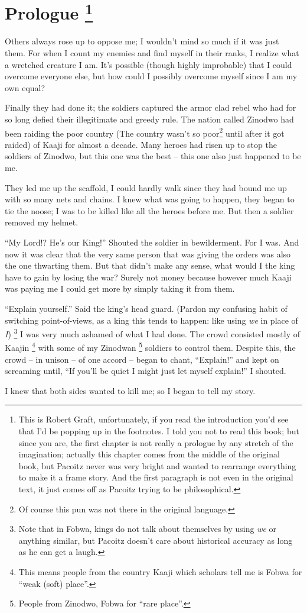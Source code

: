 \chapter[Prologue]{Prologue
\footnote{This is Robert Graft, unfortunately, if you read the introduction you'd see that I'd be popping up in the footnotes. I told you not to read this book; but since you are, the first chapter is not really a prologue by any stretch of the imagination; actually this chapter comes from the middle of the original book, but Pacoitz never was very bright and wanted to rearrange everything to make it a frame story. And the first paragraph is not even in the original text, it just comes off as Pacoitz trying to be philosophical.}
}
Others always rose up to oppose me;
I wouldn't mind so much if it was just them.
For when I count my enemies and find myself in their ranks, I realize what a wretched creature I am.
It's possible (though highly improbable) that I could overcome everyone else, but how could I possibly overcome myself since I am my own equal?

\tbreak

Finally they had done it;
the soldiers captured the armor clad rebel who had for so long defied their illegitimate and greedy rule.
The nation called Zinodwo had been raiding the poor country (The country wasn't so poor\footnote{Of course this pun was not there in the original language.} until after it got raided) of Kaaji for almost a decade.
Many heroes had risen up to stop the soldiers of Zinodwo, but this one was the best -- this one also just happened to be me.

They led me up the scaffold, I could hardly walk since they had bound me up with so many nets and chains. I knew what was going to happen, they began to tie the noose; I was to be killed like all the heroes before me. But then a soldier removed my helmet.

``My Lord!? He's our King!'' Shouted the soldier in bewilderment.
For I was.
And now it was clear that the very same person that was giving the orders was also the one thwarting them.
But that didn't make any sense, what would I the king have to gain by losing the war? Surely not money because however much Kaaji was paying me I could get more by simply taking it from them.

\indent ``Explain yourself.'' Said the king's head guard.
(Pardon my confusing habit of switching point-of-views, as a king this tends to happen: like using \emph{we} in place of \emph{I})
\footnote{Note that in Fo\-bwa, kings do not talk about themselves by using \emph{we} or anything similar, but Pacoitz doesn't care about historical accuracy as long as he can get a laugh.}
I was very much ashamed of what I had done.
The crowd consisted mostly of Kaajin
\footnote{This means people from the country Kaaji which scholars tell me is Fo\-bwa for ``weak (soft) place''.} with some of my Zinodwan
\footnote{People from Zinodwo, Fo\-bwa for ``rare place''.} soldiers to control them. Despite this, the crowd -- in unison -- of one accord -- began to chant, ``Explain!'' and kept on screaming until, ``If you'll be quiet I might just let myself explain!'' I shouted. 

I knew that both sides wanted to kill me; so I began to tell my story.

